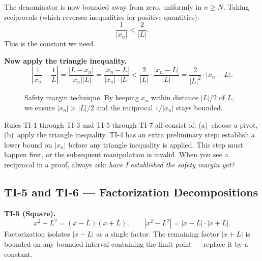 The denominator is now bounded away from zero, uniformly in $n \ge N$.
Taking reciprocals (which reverses inequalities for positive quantities):
\[
  \frac{1}{|x_n|} < \frac{2}{|L|}.
\]
This is the constant we need.

\medskip

\noindent\textbf{Now apply the triangle inequality.}
\[
  \left|\frac{1}{x_n} - \frac{1}{L}\right|
  = \frac{|L - x_n|}{|x_n||L|}
  = \frac{|x_n - L|}{|x_n| \cdot |L|}
  < \frac{2}{|L|} \cdot \frac{|x_n - L|}{|L|}
  = \frac{2}{|L|^2} \cdot |x_n - L|.
\]

\begin{figure}[h]
\centering
{}
\caption{Safety margin technique. By keeping $x_n$ within distance
$|L|/2$ of $L$, we ensure $|x_n| > |L|/2$ and the reciprocal
$1/|x_n|$ stays bounded.}
\end{figure}

\begin{remark*}
Rules TI-1 through TI-3 and TI-5 through TI-7 all consist of:
(a)~choose a pivot, (b)~apply the triangle inequality.
TI-4 has an extra preliminary step: establish a lower bound on
$|x_n|$ before any triangle inequality is applied.
This step must happen first, or the subsequent manipulation is invalid.
When you see a reciprocal in a proof, always ask:
\emph{have I established the safety margin yet?}
\end{remark*}

\subsection{TI-5 and TI-6 — Factorization Decompositions}

\textbf{TI-5 (Square).}
\[
  x^2 - L^2 = (x - L)(x + L),
  \qquad
  |x^2 - L^2| = |x - L| \cdot |x + L|.
\]
Factorization isolates $|x - L|$ as a single factor.
The remaining factor $|x + L|$ is bounded on any bounded interval
containing the limit point — replace it by a constant.

